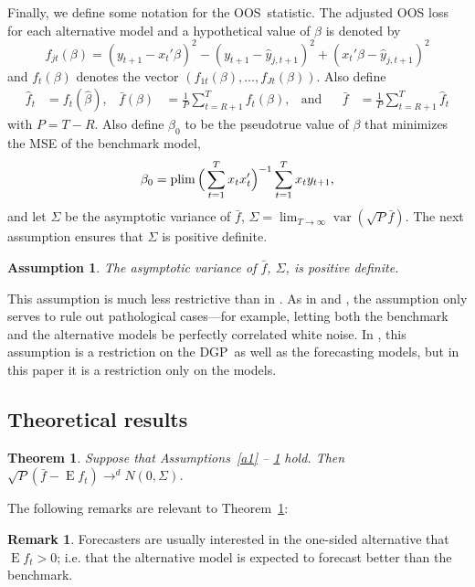 \documentclass[12pt,fleqn]{article}
\newtheorem{thm}{Theorem}
\newtheorem{asmp}{Assumption}
\theoremstyle{definition}
\newtheorem{rem}{Remark}
\DeclareMathOperator{\E}{E}
\DeclareMathOperator{\var}{var}
\DeclareMathOperator*{\plim}{plim}
\newcommand{\btrue}[1][]{\if#1*\hat\beta_{T+1}\else\beta_0\fi}
\newcommand{\bh}{\hat{\beta}}
\newcommand{\fb}{\bar{f}}
\newcommand{\fh}{\hat{f}}
\newcommand{\yh}{\hat{y}}
\newcommand{\osum}[1]{\sum_{#1=R+1}^T}
\newcommand{\oavg}[1]{\tfrac{1}{P} \osum{#1}}
\newcommand{\dgp}{DGP}
\newcommand{\oos}{OOS}
\begin{document}
Finally, we define some notation for the \oos\ statistic. The
adjusted OOS loss for each alternative model and a hypothetical value
of $\beta$ is denoted by
\begin{equation}
  f_{jt}(\beta) = (y_{t+1} - x_t'\beta)^2
  - (y_{t+1} - \yh_{j,t+1})^2 + (x_t'\beta - \yh_{j,t+1})^2
\end{equation}
and $f_t(\beta)$ denotes the vector $(f_{1t}(\beta),\dots,f_{Jt}(\beta))$.
Also define
\begin{align*}
  \fh_t &= f_t(\bh),
  &\fb(\beta) &= \oavg{t} f_t(\beta),
  &\text{and}&
  &\fb &= \tfrac1P \sum_{t=R+1}^{T} \fh_t
\end{align*}
with $P = T - R$. Also define $\beta_0$ to be the pseudotrue value of
$\beta$ that minimizes the MSE of the benchmark model,
\begin{equation*}
  \btrue = \plim \Big( \sum_{t=1}^T x_t x_t' \Big)^{-1} \sum_{t=1}^T x_t y_{t+1},
\end{equation*}
and let $\Sigma$ be the asymptotic variance of $\fb$, $\Sigma
= \lim_{T \to \infty} \var(\sqrt{P} \fb)$.
The next assumption ensures that $\Sigma$ is positive definite.
\begin{asmp}\label{a4}%
  The asymptotic variance of $\fb$, $\Sigma$, is positive definite.
\end{asmp}

This assumption is much less restrictive than in \cite{Wes:96}.  As in
\cite{GiW:06} and \citet{ClW:06,ClW:07}, the assumption only serves to
rule out pathological cases---for example, letting both the benchmark
and the alternative models be perfectly correlated white noise. In
\citet{Wes:96}, this assumption is a restriction on the \dgp\ as well
as the forecasting models, but in this paper it is a restriction only
on the models.

\subsection{Theoretical results}
\label{sec:1b}

\begin{thm}\label{res:1}
  Suppose that Assumptions~\ref{a1} -- \ref{a4} hold.  Then $\sqrt{P}
  (\fb - \E f_t) \to^d N(0, \Sigma)$.
\end{thm}

The following remarks are relevant to Theorem~\ref{res:1}:

\begin{rem}
  Forecasters are usually interested in the one-sided alternative that
  $\E f_t > 0$; i.e. that the alternative model is expected
  to forecast better than the benchmark.
\end{rem}
\end{document}
